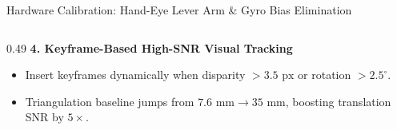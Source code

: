 \documentclass[aspectratio=169, 10pt]{beamer}
\begin{document}
\begin{frame}{Hardware Calibration: Hand-Eye Lever Arm \& Gyro Bias Elimination}
\begin{columns}[T]
\begin{column}{0.49\textwidth}
      \vspace{0.15cm}
      {\small \textbf{\textcolor{NavyBlue}{4. Keyframe-Based High-SNR Visual Tracking}}}
      \scriptsize
      \begin{itemize}
        \setlength{\itemsep}{1.5pt}
        \item Insert keyframes dynamically when disparity $> 3.5\text{ px}$ or rotation $> 2.5^\circ$.
        \item Triangulation baseline jumps from $7.6\text{ mm} \rightarrow 35\text{ mm}$, boosting translation SNR by $5\times$.
      \end{itemize}
    \end{column}
  \end{columns}
\end{frame}

\end{document}
